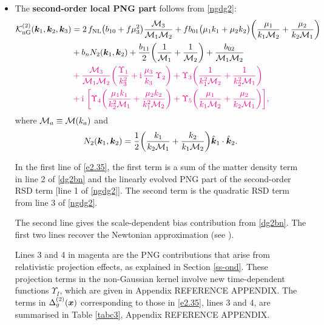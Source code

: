 {{{\begin{itemize}
\item
The {\bfseries second-order local PNG part}  follows from \eqref{ngdg2}:
\begin{align}
\mathcal{K}^{(2)}_{\mathrm{nG}}(\bm{k}_{1},\bm{k}_{2},\bm{k}_{3}) &= {2}\,f_{\mathrm{NL}}\big(b_{10}+f\mu_{3}^{2}\big)\frac{{\cal M}_{3}}{{\cal M}_{1}{\cal M}_{2}} 
+ fb_{01}\big(\mu_1k_1+\mu_2k_2\big) \bigg(\frac{\mu_1}{k_1{\cal M}_{2}} + \frac{\mu_2}{k_2 {\cal M}_{1}} \bigg)
\notag 
\\  &
+ b_{n}{N}_{2}(\bm{k}_{1},\bm{k}_{2})  + \frac{b_{11}}{2}\bigg(\frac{1}{{\cal M}_{1}} + \frac{1}{{\cal M}_{2}}\bigg) 
+\frac{b_{02}}{{\cal M}_{1}{\cal M}_{2}} 
\notag \\ &
{\color{magenta}{{}+\frac{{\cal M}_3}{{\cal M}_{1}{\cal M}_{2}}\bigg( \frac{\Upsilon_{1}}{k_3^2} + \mathrm{i}\,\frac{\mu_{3}}{k_3}\,\Upsilon_{2} \bigg) 
+{\Upsilon_{3}} \bigg(\frac{1}{k_{1}^{2}{\cal M}_{2}} + \frac{1}{k_{2}^{2}{\cal M}_{1}}\bigg) }}
\nonumber \\
 &
{\color{magenta}{{} + \mathrm{i\,}\,\bigg[{\Upsilon_{4}}\bigg(\frac{\mu_{1}k_{1}}{k_2^2{\cal M}_{1}} + \frac{\mu_{2}k_{2}}{k_1^2{\cal M}_{2}}\bigg)  
 +{\Upsilon_{5}} \bigg(\frac{\mu_{1}}{k_1{\cal M}_{2}} + \frac{\mu_{2}}{k_2{\cal M}_{1}}\bigg) \bigg] ,}} \label{e2.35} 
\end{align}
where ${\cal M}_a \equiv {\cal M}(k_a)$ and
\begin{equation}
N_{2}(\bm{k}_{1},\bm{k}_{2}) = \frac{1}{2} \bigg(\frac{k_1}{k_2{\cal M}_1 }+ \frac{k_2}{k_1{\cal M}_2 } \bigg) \hat{\bm {k}}_1\cdot \hat{\bm {k}}_2 . \label{n2k}
\end{equation}


In the first line of \eqref{e2.35}, the first term is a sum of the  matter density term in line 2 of \eqref{dg2bn} and the linearly evolved PNG part of the second-order RSD term [line 1 of  \eqref{ngdg2}]. The second term is the quadratic RSD term from line 3 of \eqref{ngdg2}. 

The second line gives the scale-dependent bias contribution from \eqref{dg2bn}. The first two lines recover the Newtonian approximation (see \cite{Tellarini:2015faa}). 

Lines 3 and 4 in {magenta} are the PNG contributions that arise from relativistic projection effects, as explained in Section \ref{ss-ond}. 
These projection terms in the non-Gaussian kernel involve new time-dependent functions $\Upsilon_I$, which are given in Appendix REFERENCE APPENDIX.
{The terms in $\Delta_g^{(2)}(\bm {x})$ corresponding to those in \eqref{e2.35}, lines 3 and 4, are summarised in Table \ref{tabc3}, Appendix REFERENCE APPENDIX.}


\end{itemize}}}}
